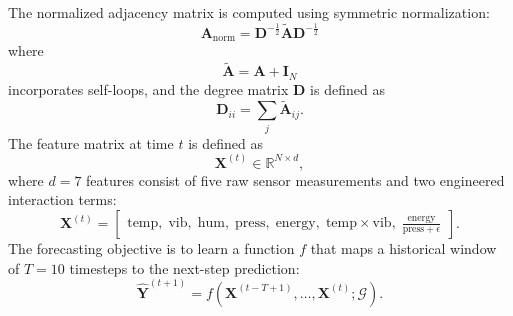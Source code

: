 The normalized adjacency matrix is computed using symmetric normalization:
\begin{equation}
\mathbf{A}_{\text{norm}} = \mathbf{D}^{-\frac{1}{2}} \tilde{\mathbf{A}} \mathbf{D}^{-\frac{1}{2}}
\end{equation}
where
\begin{equation}
\tilde{\mathbf{A}} = \mathbf{A} + \mathbf{I}_N
\end{equation}
incorporates self-loops, and the degree matrix $\mathbf{D}$ is defined as
\begin{equation}
\mathbf{D}_{ii} = \sum_{j} \tilde{\mathbf{A}}_{ij}.
\end{equation}
The feature matrix at time $t$ is defined as
\begin{equation}
\mathbf{X}^{(t)} \in \mathbb{R}^{N \times d},
\end{equation}
where $d = 7$ features consist of five raw sensor measurements and two engineered interaction terms:
\begin{equation}
\mathbf{X}^{(t)} =
\begin{bmatrix}
\text{temp},\;
\text{vib},\;
\text{hum},\;
\text{press},\;
\text{energy},\;
\text{temp} \times \text{vib},\;
\frac{\text{energy}}{\text{press} + \epsilon}
\end{bmatrix}.
\end{equation}
The forecasting objective is to learn a function $f$ that maps a historical window of $T = 10$ timesteps to the next-step prediction:
\begin{equation}
\hat{\mathbf{Y}}^{(t+1)} =
f\left(
\mathbf{X}^{(t-T+1)}, \ldots, \mathbf{X}^{(t)}; \mathcal{G}
\right).
\end{equation}
